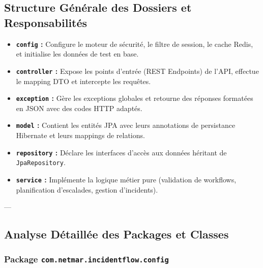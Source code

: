 \documentclass[12pt,a4paper]{article}
\begin{document}
\subsection{Structure Générale des Dossiers et Responsabilités}
\begin{itemize}
    \item \textbf{\texttt{config} :} Configure le moteur de sécurité, le filtre de session, le cache Redis, et initialise les données de test en base.
    \item \textbf{\texttt{controller} :} Expose les points d'entrée (REST Endpoints) de l'API, effectue le mapping DTO et intercepte les requêtes.
    \item \textbf{\texttt{exception} :} Gère les exceptions globales et retourne des réponses formatées en JSON avec des codes HTTP adaptés.
    \item \textbf{\texttt{model} :} Contient les entités JPA avec leurs annotations de persistance Hibernate et leurs mappings de relations.
    \item \textbf{\texttt{repository} :} Déclare les interfaces d'accès aux données héritant de \texttt{JpaRepository}.
    \item \textbf{\texttt{service} :} Implémente la logique métier pure (validation de workflows, planification d'escalades, gestion d'incidents).
\end{itemize}

---

\subsection{Analyse Détaillée des Packages et Classes}

\subsubsection{Package \texttt{com.netmar.incidentflow.config}}
\end{document}

